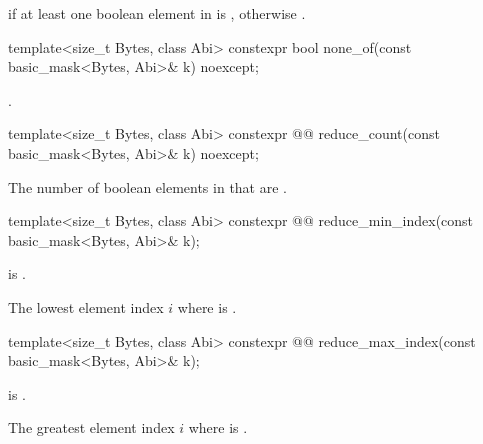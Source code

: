 \begin{itemdescr}
\pnum
\returns
{} if at least one boolean element in  is ,
otherwise .
\end{itemdescr}

\begin{itemdecl}
template<size_t Bytes, class Abi>
  constexpr bool none_of(const basic_mask<Bytes, Abi>& k) noexcept;
\end{itemdecl}

\begin{itemdescr}
\pnum
\returns
{}.
\end{itemdescr}

\begin{itemdecl}
template<size_t Bytes, class Abi>
  constexpr @@ reduce_count(const basic_mask<Bytes, Abi>& k) noexcept;
\end{itemdecl}

\begin{itemdescr}
\pnum
\returns
The number of boolean elements in  that are .
\end{itemdescr}

\begin{itemdecl}
template<size_t Bytes, class Abi>
  constexpr @@ reduce_min_index(const basic_mask<Bytes, Abi>& k);
\end{itemdecl}

\begin{itemdescr}
\pnum
\expects
{} is .

\pnum
\returns
The lowest element index $i$ where  is .
\end{itemdescr}

\begin{itemdecl}
template<size_t Bytes, class Abi>
  constexpr @@ reduce_max_index(const basic_mask<Bytes, Abi>& k);
\end{itemdecl}

\begin{itemdescr}
\pnum
\expects
{} is .

\pnum
\returns
The greatest element index $i$ where  is .
\end{itemdescr}

